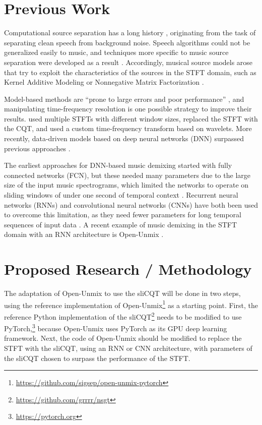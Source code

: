 \documentclass[letter,12pt]{article}
\begin{document}
\section{Previous Work}

Computational source separation has a long history \parencite{musicsepgood}, originating from the task of separating clean speech from background noise. Speech algorithms could not be generalized easily to music, and techniques more specific to music source separation were developed as a result \parencite{musicsepintro1}. Accordingly, musical source models arose that try to exploit the characteristics of the sources in the STFT domain, such as Kernel Additive Modeling or Nonnegative Matrix Factorization \parencite{musicsepgood}.

Model-based methods are ``prone to large errors and poor performance'' \parencite[13]{musicsepintro1}, and manipulating time-frequency resolution is one possible strategy to improve their results. \textcite{driedger} used multiple STFTs with different window sizes, \textcite{fitzgerald2} replaced the STFT with the CQT, and \textcite{wavelets} used a custom time-frequency transform based on wavelets. More recently, data-driven models based on deep neural networks (DNN) surpassed previous approaches \parencite{sisec2018, musicsepintro1}.

The earliest approaches for DNN-based music demixing started with fully connected networks (FCN), but these needed many parameters due to the large size of the input music spectrograms, which limited the networks to operate on sliding windows of under one second of temporal context \parencite{musicsepgood}. Recurrent neural networks (RNNs) \parencite{umxorig1} and convolutional neural networks (CNNs) \parencite{plumbley1} have both been used to overcome this limitation, as they need fewer parameters for long temporal sequences of input data \parencite{musicsepgood}. A recent example of music demixing in the STFT domain with an RNN architecture is Open-Unmix \parencite{umx}.

\section{Proposed Research / Methodology}

The adaptation of Open-Unmix to use the sliCQT will be done in two steps, using the reference implementation of Open-Unmix\footnote{\url{https://github.com/sigsep/open-unmix-pytorch}} as a starting point. First, the reference Python implementation of the sliCQT\footnote{\url{https://github.com/grrrr/nsgt}} needs to be modified to use PyTorch,\footnote{\url{https://pytorch.org}} because Open-Unmix uses PyTorch as its GPU deep learning framework. Next, the code of Open-Unmix should be modified to replace the STFT with the sliCQT, using an RNN or CNN architecture, with parameters of the sliCQT chosen to surpass the performance of the STFT.
\end{document}
